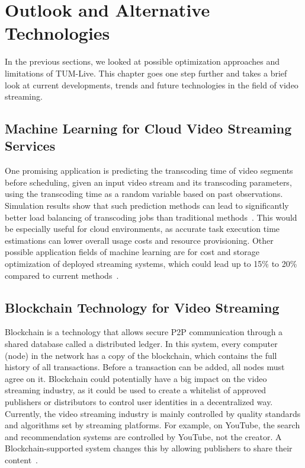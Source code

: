 
\chapter{Outlook and Alternative Technologies}\label{chapter:outlook}

In the previous sections, we looked at possible optimization approaches and limitations of TUM-Live. This chapter goes one step further and takes a brief look at current developments, trends and future technologies in the field of video streaming.

\section{Machine Learning for Cloud Video Streaming Services}

One promising application is predicting the transcoding time of video segments before scheduling, given an input video stream and its transcoding parameters, using the transcoding time as a random variable based on past observations. Simulation results show that such prediction methods can lead to significantly better load balancing of transcoding jobs than traditional methods~\parencite{cloud_predicting}.
This would be especially useful for cloud environments, as accurate task execution time estimations can lower overall usage costs and resource provisioning. Other possible application fields of machine learning are for cost and storage optimization of deployed streaming systems, which could lead up to 15\% to 20\% compared to current methods~\parencite{deep_learning_cloud}.

\section{Blockchain Technology for Video Streaming}

Blockchain is a technology that allows secure \ac{P2P} communication through a shared database called a distributed ledger. In this system, every computer (node) in the network has a copy of the blockchain, which contains the full history of all transactions. Before a transaction can be added, all nodes must agree on it.
Blockchain could potentially have a big impact on the video streaming industry, as it could be used to create a whitelist of approved publishers or distributors to control user identities in a decentralized way.
Currently, the video streaming industry is mainly controlled by quality standards and algorithms set by streaming platforms. For example, on YouTube, the search and recommendation systems are controlled by YouTube, not the creator. A Blockchain-supported system changes this by allowing publishers to share their content~\parencite{cloud_streaming}.

